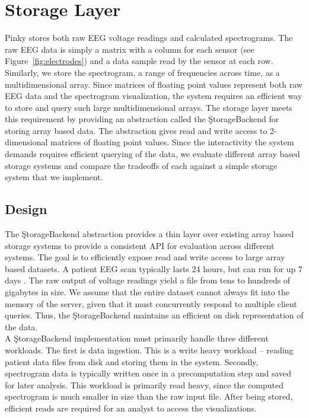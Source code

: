 \chapter{Storage Layer}\label{storage-ch}

Pinky stores both raw EEG voltage readings and calculated spectrograms. The raw
EEG data is simply a matrix with a column for each sensor (see
Figure~\ref{fig:electrodes}) and a data sample read by the sensor at each row.
Similarly, we store the spectrogram, a range of frequencies across time, as a
multidimensional array. Since matrices of floating point values represent both
raw EEG data and the spectrogram visualization, the system requires an
efficient way to store and query such large multidimensional arrays. The
storage layer meets this requirement by providing an abstraction called the
\c{StorageBackend} for storing array based data. The abstraction gives read and
write access to 2-dimensional matrices of floating point values. Since the
interactivity the system demands requires efficient querying of the data, we
evaluate different array based storage systems and compare the tradeoffs of
each against a simple storage system that we implement.

\section{Design}

The \c{StorageBackend} abstraction provides a thin layer over existing array
based storage systems to provide a consistent API for evaluation across
different systems. The goal is to efficiently expose read and write access to
large array based datasets. A patient EEG scan typically lasts 24 hours, but
can run for up 7 days \cite{ceeg-3}. The raw output of voltage readings yield a
file from tens to hundreds of gigabytes in size. We assume that the entire
dataset cannot always fit into the memory of the server, given that it must
concurrently respond to multiple client queries. Thus, the \c{StorageBackend}
maintains an efficient on disk representation of the data. \\

A \c{StorageBackend} implementation must primarily handle three different
workloads. The first is data ingestion. This is a write heavy workload --
reading patient data files from disk and storing them in the system. Secondly,
spectrogram data is typically written once in a precomputation step and saved
for later analysis. This workload is primarily read heavy, since the computed
spectrogram is much smaller in size than the raw input file.  After being
stored, efficient reads are required for an analyst to access the
visualizations.

